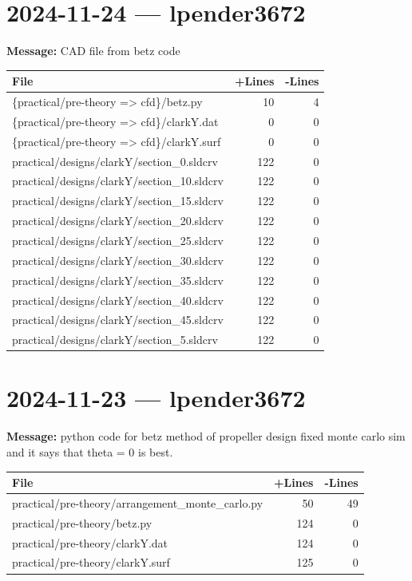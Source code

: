 \documentclass{article}
\begin{document}
\section*{2024-11-24 --- lpender3672}
\textbf{Message:} CAD file from betz code

\begin{longtable}{|p{10cm}|r|r|}
\hline \textbf{File} & \textbf{+Lines} & \textbf{-Lines} \\
\hline
\{practical/pre-theory => cfd\}/betz.py & 10 & 4 \\
\hline
\{practical/pre-theory => cfd\}/clarkY.dat & 0 & 0 \\
\hline
\{practical/pre-theory => cfd\}/clarkY.surf & 0 & 0 \\
\hline
practical/designs/clarkY/section\_0.sldcrv & 122 & 0 \\
\hline
practical/designs/clarkY/section\_10.sldcrv & 122 & 0 \\
\hline
practical/designs/clarkY/section\_15.sldcrv & 122 & 0 \\
\hline
practical/designs/clarkY/section\_20.sldcrv & 122 & 0 \\
\hline
practical/designs/clarkY/section\_25.sldcrv & 122 & 0 \\
\hline
practical/designs/clarkY/section\_30.sldcrv & 122 & 0 \\
\hline
practical/designs/clarkY/section\_35.sldcrv & 122 & 0 \\
\hline
practical/designs/clarkY/section\_40.sldcrv & 122 & 0 \\
\hline
practical/designs/clarkY/section\_45.sldcrv & 122 & 0 \\
\hline
practical/designs/clarkY/section\_5.sldcrv & 122 & 0 \\
\hline
\end{longtable}

\section*{2024-11-23 --- lpender3672}
\textbf{Message:} python code for betz method of propeller design fixed monte carlo sim and it says that theta = 0 is best.

\begin{longtable}{|p{10cm}|r|r|}
\hline \textbf{File} & \textbf{+Lines} & \textbf{-Lines} \\
\hline
practical/pre-theory/arrangement\_monte\_carlo.py & 50 & 49 \\
\hline
practical/pre-theory/betz.py & 124 & 0 \\
\hline
practical/pre-theory/clarkY.dat & 124 & 0 \\
\hline
practical/pre-theory/clarkY.surf & 125 & 0 \\
\hline
\end{longtable}
\end{document}
